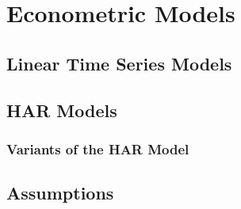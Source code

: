 \chapter{Econometric Models}
\label{sec:orga4fdf75}

\section{Linear Time Series Models}
\label{sec:orgd6b7089}

\section{HAR Models}
\label{sec:org9b8c0b5}

\subsection{Variants of the HAR Model}
\label{sec:orgka0i1f3}

\section{Assumptions}
\label{sec:org360241f}
